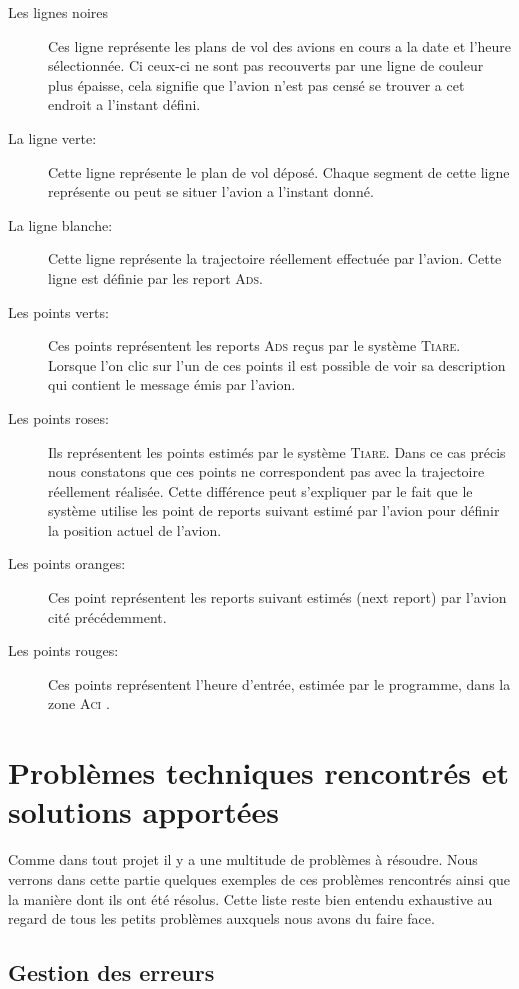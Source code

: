 \begin{description}
\item[Les lignes noires] Ces ligne représente les plans de vol des avions en cours a la date et l'heure sélectionnée. Ci ceux-ci ne sont pas recouverts par une ligne de couleur plus épaisse, cela signifie que l'avion n'est pas censé se trouver a cet endroit a l'instant défini. 
\item[La ligne verte:] Cette ligne représente le plan de vol déposé. Chaque segment de cette ligne représente ou peut se situer l'avion a l'instant donné.
\item[La ligne blanche:] Cette ligne représente la trajectoire réellement effectuée par l'avion. Cette ligne est définie par les report \textsc{Ads}.
\item[Les points verts:] Ces points représentent les reports \textsc{Ads} reçus par le système \textsc{Tiare}. Lorsque l'on clic sur l'un de ces points il est possible de voir sa description qui contient le message émis par l'avion.
\item[Les points roses:] Ils représentent les points estimés par le système \textsc{Tiare}. Dans ce cas précis nous constatons que ces points ne correspondent pas avec la trajectoire réellement réalisée. Cette différence peut s'expliquer par le fait que le système utilise les point de reports suivant estimé par l'avion pour définir la position actuel de l'avion.
\item[Les points oranges:] Ces point représentent les reports suivant estimés (next report) par l'avion cité précédemment.
\item[Les points rouges:] Ces points représentent l'heure d'entrée, estimée par le programme, dans la zone \textsc{Aci} . 
\end{description}




\section{Problèmes techniques rencontrés et solutions apportées}
Comme dans tout projet il y a une multitude de problèmes à résoudre. Nous verrons dans cette partie quelques exemples de ces problèmes rencontrés ainsi que la manière dont ils ont été résolus. Cette liste reste bien entendu exhaustive au regard de tous les petits problèmes auxquels nous avons du faire face.

    \subsection{Gestion des erreurs}

